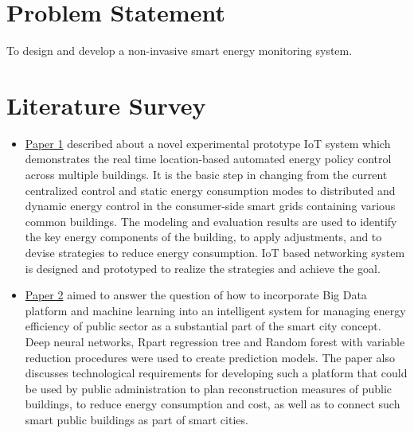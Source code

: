 \documentclass[12 pt]{report}
\begin{document}
\section{Problem Statement}
To design and develop a non-invasive smart energy monitoring system.

 \newpage 
\section{Literature Survey }


\begin{itemize}
\item \underline{Paper 1} described about a novel experimental prototype IoT system which demonstrates the real time location-based automated energy policy control across multiple buildings. It is the basic step in changing from the current centralized control and static energy consumption modes to distributed and dynamic energy control in the consumer-side smart grids containing various common buildings. The modeling and evaluation results are used to identify the key energy components of the building, to apply adjustments, and to devise strategies to reduce energy consumption. IoT based networking system is designed and prototyped to realize the strategies and achieve the goal.
\newline
\end{itemize}

 \begin{itemize}
\item \underline{Paper 2} aimed to answer the question of how to incorporate Big Data platform and machine learning into an intelligent system for managing energy efficiency of public sector as a substantial part of the smart city concept. Deep neural networks, Rpart regression tree and Random forest with variable reduction procedures were used to create prediction models. The paper also discusses technological requirements for developing such a platform that could be used by public administration to plan reconstruction measures of public buildings, to reduce energy consumption and cost, as well as to connect such smart public buildings as part of smart cities.
\newline
\end{itemize}
\end{document}

